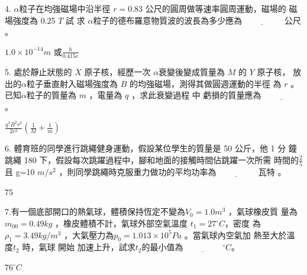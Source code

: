 \documentclass[cn,10pt,math=newtx,chinesefont=founder,device=ig]{elegantbook}
\begin{document}
\newpage


\begin{example}
   4. $\alpha$粒子在均強磁場中沿半徑 $r =0.83$ 公尺的圓周做等速率圓周運動，磁場的
磁場強度為 0.25 $T$ 試 求 $\alpha$粒子的德布羅意物質波的波長為多少應為$\underline{\hspace{2cm}}$
公尺 。\\
    \rightline{[復興高中教甄109]}
\end{example}
\begin{solution}
    $1.0\times10^{-14}m$ 或$\frac{h}{0.415e}$
\end{solution}

\newpage


\begin{example}
   5. 處於靜止狀態的 $X$ 原子核，經歷一次 $\alpha$衰變後變成質量為 $M$ 的 $Y$ 原子核，
放出的$\alpha$粒子垂直射入磁場強度為 $B$ 的均強磁場，測得其做圓週運動的半徑
為 $r$ 。已知$\alpha$粒子的質量為 $m$ ，電量為 $q$ ，求此衰變過程 中 虧損的質量應為$\underline{\hspace{2cm}}$
。\\
    \rightline{[復興高中教甄109]}
\end{example}
\begin{solution}
    $\frac{q^2 B^2 r^2}{2c^2}(\frac{1}{M}+\frac{1}{m})$
\end{solution}

\newpage


\begin{example}
   6. 體育班的同學進行跳繩健身運動，假設某位學生的質量是 50 公斤，他 1 分
鐘跳繩 180 下，假設每次跳躍過程中，腳和地面的接觸時間佔跳躍一次所需
時間的$\frac{2}{5}$且 g=10 $m/s^2$ ，則同學跳繩時克服重力做功的平均功率為$\underline{\hspace{2cm}}$
瓦特 。\\
    \rightline{[復興高中教甄109]}
\end{example}
\begin{solution}
    $75$
\end{solution}

\newpage


\begin{example}
   7.有一個底部開口的熱氣球，體積保持恆定不變為$V_0=1.0 m^3$ ，氣球橡皮質
量為 $m_00=0.49 kg$ ，橡皮體積不計，氣球外部空氣溫度 $t_1=27 ^\circ C $，密度
為 $\rho_1=3.49 kg/m^3$ ，大氣壓力為$p_0=1.013\times10^5 Pa$ 。當氣球內空氣加
熱至大於溫度$t_2$ 時，氣球 開始 加速上升，試求$t_2$的最小值為$\underline{\hspace{2cm}} ^\circ C$。\\
    \rightline{[復興高中教甄109]}
\end{example}
\begin{solution}
    $76 ^\circ C$
\end{solution}
\end{document}
